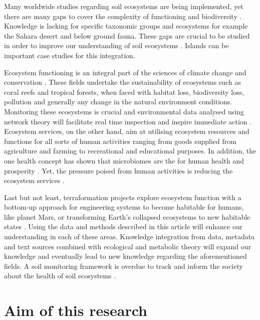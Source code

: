 Many worldwide studies regarding soil ecosystems are being implemented, yet
there are many gaps to cover the complexity of functioning and biodiversity
\parencite{guerra2020Blind}. Knowledge is lacking for specific taxonomic groups and
ecosystems for example the Sahara desert and below ground fauna.
These gaps are crucial to be studied in order to
improve our understanding of soil ecosystems \parencite{cameron2018Global}. 
Islands can be important case studies for this integration.

Ecosystem functioning is an integral part of the sciences of climate change
and conservation \parencite{cavicchioli2019scientists}. These fields undertake the
sustainability of ecosystems such as coral reefs and tropical forests, when
faced with habitat loss, biodiversity loss, pollution and generally any change
in the natural environment conditions. Monitoring these ecosystems is crucial
and environmental data analysed using network theory will facilitate real time
inspection and inspire immediate action \parencite{derocles2018Biomonitoring}.
Ecosystem services, on the other hand, aim at utilising ecosystem resources
and functions for all sorts of human activities ranging from goods supplied
from agriculture and farming \parencite{alvarez-silva2017Compartmentalized} to
recreational and educational purposes. In addition, the one health concept has
shown that microbiomes are the for human health and prosperity
\parencite{banerjee2023Soil, lehmann2020concept}. Yet, the pressure poised from human activities
is reducing the ecosystem services \parencite{rillig2023Increasing}.

Last but not least, terraformation
projects explore ecosystem function with a bottom-up approach for engineering
systems to become habitable for humans, like planet Mars, or transforming
Earth's collapsed ecosystems to new habitable states
\parencite{conde-pueyo2020Synthetic}. Using the data and methods described in this
article will enhance our understanding in each of these areas. Knowledge
integration from data, metadata and text sources combined with ecological and
metabolic theory will expand our knowledge and eventually lead to new
knowledge regarding the aforementioned fields. A soil monitoring framework 
is overdue to track and inform the society about the health of 
soil ecosystems \parencite{guerra2021tracking}.

\section{Aim of this research}
\label{sec:aim}

